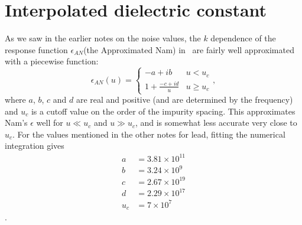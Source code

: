 \documentclass[11pt]{article}
\begin{document}
	\graphicspath{{figures/}}

	\section{Interpolated dielectric constant} \label{sec:bigkinterpolation}

	As we saw in the earlier notes on the noise values, the $k$ dependence of the response function $\epsilon_{AN}$(the Approximated Nam) in~\cite{Nam1967} are fairly well approximated with a piecewise function:
	\begin{equation}
		\epsilon_{AN}(u) =
		\begin{cases}
			-a + i b & u < u_c \\
			1 + \frac{-c + i d}{u} & u \geq u_c
		\end{cases},
	\end{equation} \label{eq:epsAN}
	where $a$, $b$, $c$ and $d$ are real and positive (and are determined by the frequency) and $u_c$ is a cutoff value on the order of the impurity spacing.
	This approximates Nam's $\epsilon$ well for $u \ll u_c$ and $u \gg u_c$, and is somewhat less accurate very close to $u_c$.
	For the values mentioned in the other notes for lead, fitting the numerical integration gives
	\begin{align}
		a &= 3.81 \times 10^{11} \\
		b &= 3.24 \times 10^{9} \\
		c &= 2.67 \times 10^{19} \\
		d &= 2.29 \times 10^{17} \\
		u_c &= 7 \times 10^{7}
	\end{align}.
\end{document}
